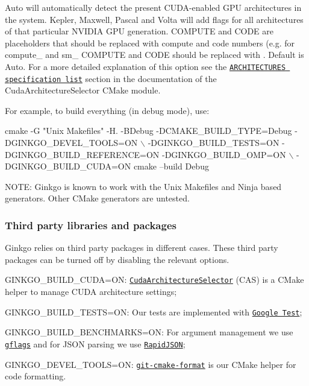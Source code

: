 \begin{DoxyItemize}
{\ttfamily Auto} will automatically detect the present C\+U\+D\+A-\/enabled G\+PU architectures in the system. {\ttfamily Kepler}, {\ttfamily Maxwell}, {\ttfamily Pascal} and {\ttfamily Volta} will add flags for all architectures of that particular N\+V\+I\+D\+IA G\+PU generation. {\ttfamily C\+O\+M\+P\+U\+TE} and {\ttfamily C\+O\+DE} are placeholders that should be replaced with compute and code numbers (e.\+g. for {\ttfamily compute\+\_} and {\ttfamily sm\+\_} {\ttfamily C\+O\+M\+P\+U\+TE} and {\ttfamily C\+O\+DE} should be replaced with {}. Default is {\ttfamily Auto}. For a more detailed explanation of this option see the \href{https://github.com/ginkgo-project/CudaArchitectureSelector/blob/master/CudaArchitectureSelector.cmake#L58}{\tt {\ttfamily A\+R\+C\+H\+I\+T\+E\+C\+T\+U\+R\+ES} specification list} section in the documentation of the Cuda\+Architecture\+Selector C\+Make module.
\end{DoxyItemize}

For example, to build everything (in debug mode), use\+:


\begin{DoxyCode}
cmake  -G "Unix Makefiles" -H. -BDebug -DCMAKE\_BUILD\_TYPE=Debug -DGINKGO\_DEVEL\_TOOLS=ON \(\backslash\)
              -DGINKGO\_BUILD\_TESTS=ON -DGINKGO\_BUILD\_REFERENCE=ON -DGINKGO\_BUILD\_OMP=ON \(\backslash\)
              -DGINKGO\_BUILD\_CUDA=ON 
cmake --build Debug
\end{DoxyCode}


N\+O\+TE\+: Ginkgo is known to work with the {\ttfamily Unix Makefiles} and {\ttfamily Ninja} based generators. Other C\+Make generators are untested.

\subsubsection*{Third party libraries and packages}

Ginkgo relies on third party packages in different cases. These third party packages can be turned off by disabling the relevant options.


\begin{DoxyItemize}
\item G\+I\+N\+K\+G\+O\+\_\+\+B\+U\+I\+L\+D\+\_\+\+C\+U\+DA=ON\+: \href{https://github.com/ginkgo-project/CudaArchitectureSelector}{\tt Cuda\+Architecture\+Selector} (C\+AS) is a C\+Make helper to manage C\+U\+DA architecture settings;
\item G\+I\+N\+K\+G\+O\+\_\+\+B\+U\+I\+L\+D\+\_\+\+T\+E\+S\+TS=ON\+: Our tests are implemented with \href{https://github.com/google/googletest}{\tt Google Test};
\item G\+I\+N\+K\+G\+O\+\_\+\+B\+U\+I\+L\+D\+\_\+\+B\+E\+N\+C\+H\+M\+A\+R\+KS=ON\+: For argument management we use \href{https://github.com/gflags/gflags}{\tt gflags} and for J\+S\+ON parsing we use \href{https://github.com/Tencent/rapidjson}{\tt Rapid\+J\+S\+ON};
\item G\+I\+N\+K\+G\+O\+\_\+\+D\+E\+V\+E\+L\+\_\+\+T\+O\+O\+LS=ON\+: \href{https://github.com/gflegar/git-cmake-format}{\tt git-\/cmake-\/format} is our C\+Make helper for code formatting.
\end{DoxyItemize}

